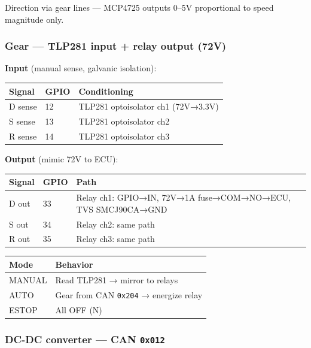 Direction via gear lines --- MCP4725 outputs 0--5V proportional to speed
magnitude only.

\subsubsection{Gear --- TLP281 input + relay output
(72V)}\label{gear-tlp281-input-relay-output-72v}

\textbf{Input} (manual sense, galvanic isolation):

\begin{longtable}[]{@{}lll@{}}
\toprule\noalign{}
Signal & GPIO & Conditioning \\
\midrule\noalign{}
\endhead
\bottomrule\noalign{}
\endlastfoot
D sense & 12 & TLP281 optoisolator ch1 (72V→3.3V) \\
S sense & 13 & TLP281 optoisolator ch2 \\
R sense & 14 & TLP281 optoisolator ch3 \\
\end{longtable}

\textbf{Output} (mimic 72V to ECU):

\begin{longtable}[]{@{}lll@{}}
\toprule\noalign{}
Signal & GPIO & Path \\
\midrule\noalign{}
\endhead
\bottomrule\noalign{}
\endlastfoot
D out & 33 & Relay ch1: GPIO→IN, 72V→1A fuse→COM→NO→ECU, TVS SMCJ90CA→GND \\
S out & 34 & Relay ch2: same path \\
R out & 35 & Relay ch3: same path \\
\end{longtable}

\begin{longtable}[]{@{}ll@{}}
\toprule\noalign{}
Mode & Behavior \\
\midrule\noalign{}
\endhead
\bottomrule\noalign{}
\endlastfoot
MANUAL & Read TLP281 → mirror to relays \\
AUTO & Gear from CAN \texttt{0x204} → energize relay \\
ESTOP & All OFF (N) \\
\end{longtable}

\subsubsection{\texorpdfstring{DC-DC converter --- CAN
\texttt{0x012}}{DC-DC converter --- CAN 0x012}}\label{dc-dc-converter-can-0x012}

